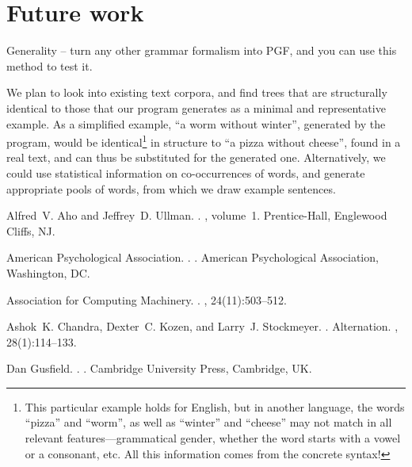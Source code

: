 \documentclass[11pt]{article}
\begin{document}
\section{Future work}


Generality -- turn any other grammar formalism into PGF, and you can use this method to test it.


We plan to look into existing text corpora, and find trees that are
structurally identical  to those that our program generates as a
minimal and representative example. As a simplified example, ``a worm
without winter'', generated by the program, would be identical\footnote{This particular example holds for English, but in another language, the words ``pizza'' and ``worm'', as well as ``winter'' and ``cheese'' may not match in all relevant features---grammatical gender, whether the word starts with a vowel or a consonant, etc. All this information comes from the concrete syntax!} 
in structure to ``a pizza without cheese'', found in a real text, and
can thus be substituted for the generated one.   
Alternatively, we could use statistical information on co-occurrences
of words, and generate appropriate pools of words, from which we draw
example sentences. 

%
%

\begin{thebibliography}{}

Alfred~V. Aho and Jeffrey~D. Ullman.
.
, volume~1.
\newblock Prentice-{Hall}, Englewood Cliffs, NJ.

{American Psychological Association}.
.
.
\newblock American Psychological Association, Washington, DC.

{Association for Computing Machinery}.
.
, 24(11):503--512.

Ashok~K. Chandra, Dexter~C. Kozen, and Larry~J. Stockmeyer.
.
\newblock Alternation.
,
  28(1):114--133.

Dan Gusfield.
.
.
\newblock Cambridge University Press, Cambridge, UK.

\end{thebibliography}
\end{document}
